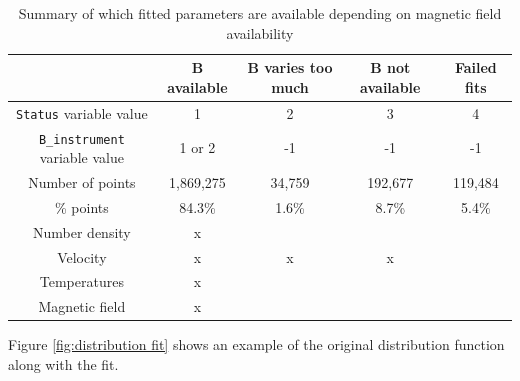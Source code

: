 \documentclass[11pt,a4paper]{article}
\begin{document}
\begin{table}
	\centering
	\begin{tabular}{ c | c | c | c | c}
									& $\mathbf{B}$ available	& $\mathbf{B}$ varies too much	& $\mathbf{B}$ not available	& Failed fits 	\\ \hline
	\texttt{Status} variable value		& 1						& 2							& 3							& 4			\\ \hline
	\texttt{B\_instrument} variable value	& 1 or 2					& -1							& -1							& -1			\\ \hline			
	Number of points 					& 1,869,275				& 34,759							& 192,677					& 119,484	\\ \hline		
	\% points						& 84.3\%					& 1.6\%							& 8.7\%						& 5.4\%		\\ \hline \hline
	Number density					& x						&							&							&			\\ 
	Velocity							& x						& x							& x							&			\\ 
	Temperatures						& x						&							&							&			\\ 
	Magnetic field					& x						&							&							&			\\
	\end{tabular}
	\caption{Summary of which fitted parameters are available depending on magnetic field availability}
	\label{tab:variable availability}
\end{table}

Figure \ref{fig:distribution fit} shows an example of the original distribution function along with the fit.
\end{document}
